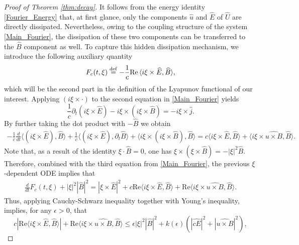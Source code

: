 \documentclass[11pt, leqno, a4paper,]{amsart}
\theoremstyle{remark}
\numberwithin{equation}{section}
\newcommand*{\bydef}{\overset{\rm def}{=}}
\begin{document}
\begin{proof}[Proof of Theorem \ref{thm:decay}]
It follows from the energy identity \eqref{Fourier_Energy} that, at first glance, only the components $\widehat{u}$ and $\widehat{E}$ of $\widehat{U}$ are directly dissipated. Nevertheless, owing to the coupling structure of the system \eqref{Main_Fourier}, the dissipation of these two components can be transferred to the $\widehat{B}$ component as well. To capture this hidden dissipation mechanism, we introduce the following auxiliary quantity
\begin{equation}\label{Functional_F}
F_c(t,\xi)
\bydef 
-\frac{1}{c} \mathrm{Re}\,\langle i\xi\times \widehat{E},\widehat{B}\rangle ,
\end{equation}
which will be the second part in the definition of the Lyapunov functional of our interest. 
Applying $(i\xi \times \cdot )$ to the second equation in \eqref{Main_Fourier} yields  
\begin{equation}\label{curl_2}
\frac{1}{c}\partial_t (i\xi\times \widehat{E})-i\xi\times(i\xi\times \widehat{B})=- i\xi\times\widehat{j}.
\end{equation}
By further taking the dot product with $-\widehat{B}$ we obtain  
\begin{eqnarray*}
-\frac{1}{c}\frac{d}{dt}\langle  (i\xi\times \widehat{E}),\widehat{B}\rangle+\frac{1}{c} \langle  (i\xi\times \widehat{E}),\partial_t\widehat{B}\rangle+\langle i\xi\times(i\xi\times \widehat{B}), \widehat{B}\rangle=c\langle i\xi\times\widehat{E},\widehat{B} \rangle+\langle i\xi\times\widehat{u\times B},\widehat{B} \rangle. 
\end{eqnarray*}
Note that, as a result of the identity $\xi\cdot \widehat{B}=0$, one has    $\xi\times(\xi\times \widehat{B})=-|\xi|^2\widehat{B}$. Therefore, combined with the third equation from \eqref{Main_Fourier}, the previous $\xi$-dependent ODE implies that 
\begin{eqnarray}\label{F_dt}
\frac{d}{dt}F_c(t,\xi)+|\xi|^2|\widehat{B}|^2=|\xi\times \widehat{E}|^2+c\mathrm{Re}\langle i\xi\times\widehat{E},\widehat{B} \rangle +\mathrm{Re}\langle i\xi\times\widehat{u\times B},\widehat{B} \rangle.
\end{eqnarray}
Thus, applying Cauchy-Schwarz inequality together with Young's inequality, implies, for any $\epsilon>0$,  that
\begin{equation*}
c|\mathrm{Re}\langle i\xi\times\widehat{E},\widehat{B} \rangle|+\mathrm{Re}\langle i\xi\times\widehat{u\times B},\widehat{B} \rangle\leq \epsilon |\xi|^2|\widehat{B}|^2+k(\epsilon)\left(|\widehat{cE}|^2+|\widehat{u\times B}|^2\right),
\end{equation*}

\end{proof}
\end{document}
